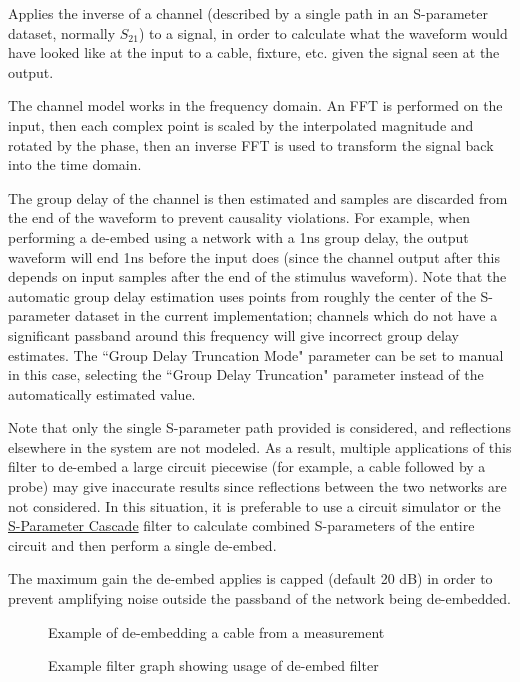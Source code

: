 Applies the inverse of a channel (described by a single path in an S-parameter dataset, normally $S_{21}$) to a signal,
in order to calculate what the waveform would have looked like at the input to a cable, fixture, etc. given the signal
seen at the output.

The channel model works in the frequency domain. An FFT is performed on the input, then each complex point is scaled by
the interpolated magnitude and rotated by the phase, then an inverse FFT is used to transform the signal back into the
time domain.

The group delay of the channel is then estimated and samples are discarded from the end of the waveform to prevent
causality violations. For example, when performing a de-embed using a network with a 1ns group delay, the output
waveform will end 1ns before the input does (since the channel output after this depends on input samples after the end
of the stimulus waveform). Note that the automatic group delay estimation uses points from roughly the center of the
S-parameter dataset in the current implementation; channels which do not have a significant passband around this
frequency will give incorrect group delay estimates. The ``Group Delay Truncation Mode" parameter can be set to manual
in this case, selecting the ``Group Delay Truncation" parameter instead of the automatically estimated value.

Note that only the single S-parameter path provided is considered, and reflections elsewhere in the system are not
modeled. As a result, multiple applications of this filter to de-embed a large circuit piecewise (for example, a cable
followed by a probe) may give inaccurate results since reflections between the two networks are not considered. In this
situation, it is preferable to use a circuit simulator or the \hyperref[filter:sparamcascade]{S-Parameter Cascade}
filter to calculate combined S-parameters of the entire circuit and then perform a single de-embed.

The maximum gain the de-embed applies is capped (default 20 dB) in order to prevent amplifying noise outside the
passband of the network being de-embedded.

\begin{figure}[h]
\centering
{}
\caption{Example of de-embedding a cable from a measurement}
\label{filter_deembed}
\end{figure}

\begin{figure}[h]
\centering
{}
\caption{Example filter graph showing usage of de-embed filter}
\label{filter_deembed_graph}
\end{figure}

